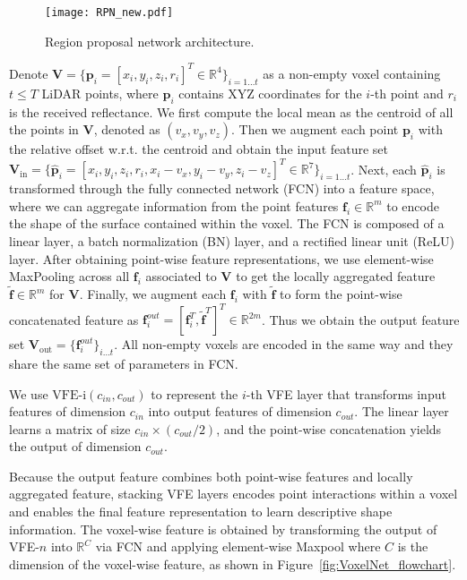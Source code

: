 \documentclass[10pt,twocolumn,letterpaper]{article}
\begin{document}
\begin{figure*}[!t]
\centering
    \texttt{[image: RPN\_new.pdf]}
    \vspace{-0.3cm}
\caption{Region proposal network architecture.}
\label{fig:RPN}
\end{figure*}


Denote $\mathbf{V} = \{\mathbf{p}_i=[x_i, y_i, z_i, r_i]^{T} \in \mathbb{R}^4\}_{i=1 \ldots t}$ as a non-empty voxel containing $t \leq T$ LiDAR points, where $\mathbf{p}_i$ contains XYZ coordinates for the $i$-th point and $r_i$ is the received reflectance. We first compute the local mean as the centroid of all the points in $\mathbf{V}$, denoted as $(v_x, v_y, v_z)$. Then we augment each point $\mathbf{p}_i$ with the relative offset w.r.t. the centroid  and obtain the input feature set $\mathbf{V}_{\textrm{in}} = \{ \hat{\mathbf{p}}_i=[x_i, y_i, z_i, r_i, x_i-v_x, y_i-v_y, z_i-v_z]^{T} \in \mathbb{R}^7 \}_{i=1 \ldots t}$. Next, each $\hat{\mathbf{p}}_i$ is transformed through the fully connected network (FCN) into a feature space, where we can aggregate information from the point features $\mathbf{f}_i \in \mathbb{R}^m$ to encode the shape of the surface contained within the voxel. The FCN is composed of a linear layer, a batch normalization (BN) layer, and a rectified linear unit (ReLU) layer. After obtaining point-wise feature representations, we use element-wise MaxPooling across all $\mathbf{f}_i$ associated to $\mathbf{V}$ to get the locally aggregated feature $\tilde{\mathbf{f}} \in \mathbb{R}^m$ for $\mathbf{V}$. Finally, we augment each $\mathbf{f}_i$ with $\tilde{\mathbf{f}}$ to form the point-wise concatenated feature as $\mathbf{f}_i^{out} = [\mathbf{f}_i^{T}, \tilde{\mathbf{f}}^{T}]^{T} \in \mathbb{R}^{2m}$. Thus we obtain the output feature set $\mathbf{V}_{\textrm{out}} = \{ \mathbf{f}_i^{out} \}_{i \ldots t}$. All non-empty voxels are encoded in the same way and they share the same set of parameters in FCN. 

We use $\textrm{VFE-i}(c_{in}, c_{out})$ to represent the $i$-th VFE layer that transforms input features of dimension $c_{in}$ into output features of dimension $c_{out}$. The linear layer learns a matrix of size $c_{in} \times (c_{out}/2)$, and the point-wise concatenation yields the output of dimension $c_{out}$.

Because the output feature combines both point-wise features and locally aggregated feature, stacking VFE layers encodes point interactions within a voxel and enables the final feature representation to learn descriptive shape information. The voxel-wise feature is obtained by transforming the output of VFE-$n$ into $\mathbb{R}^{C}$ via FCN and applying element-wise Maxpool where $C$ is the dimension of the voxel-wise feature, as shown in Figure~\ref{fig:VoxelNet_flowchart}.
\end{document}
